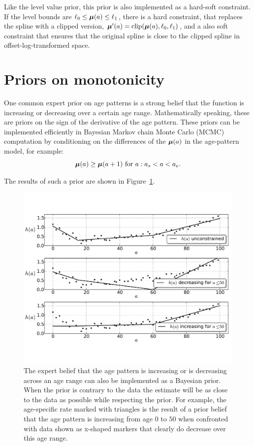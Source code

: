 Like the level value prior, this prior is also implemented as a
hard-soft constraint.  If the level bounds are $\ell_0 \leq \boldsymbol{\mu}(a)
\leq \ell_1$, there is a hard constraint, that replaces the spline with a
clipped version, $\boldsymbol{\mu}'(a) = \operatorname{clip}(\boldsymbol{\mu}(a), \ell_0, \ell_1)$, and a
also soft constraint that ensures that the original spline is close to the clipped
spline in offset-log-transformed space.

\section{Priors on monotonicity}

One common expert prior on age patterns is a strong belief that the
function is increasing or decreasing over a certain age
range. Mathematically speaking, these are priors on the sign of the
derivative of the age pattern.  These priors can be implemented efficiently in
Bayesian Markov chain Monte Carlo (MCMC) computation by conditioning on the differences of the
$\boldsymbol{\mu}(a)$ in the age-pattern model, for example:
\[
\boldsymbol{\mu}(a) \geq \boldsymbol{\mu}(a+1) \text{ for } a : a_s < a < a_e.
\]

The results of such a prior are shown in
Figure~\ref{monotone-age-pattern}.


\begin{figure}[h]
\begin{center}
\includegraphics[width=\textwidth]{monotone-smoothing-splines.pdf}
\caption{The expert belief that the age pattern is increasing or is
  decreasing across an age range can also be implemented as a Bayesian
  prior.  When the prior is contrary to the data the estimate will be
  as close to the data as possible while respecting the prior.  For
  example, the age-specific rate marked with triangles is the result
  of a prior belief that the age pattern is increasing from age $0$ to
  $50$ when confronted with data shown as x-shaped markers that
  clearly do decrease over this age range.}
\label{monotone-age-pattern}
\end{center}
\end{figure}


